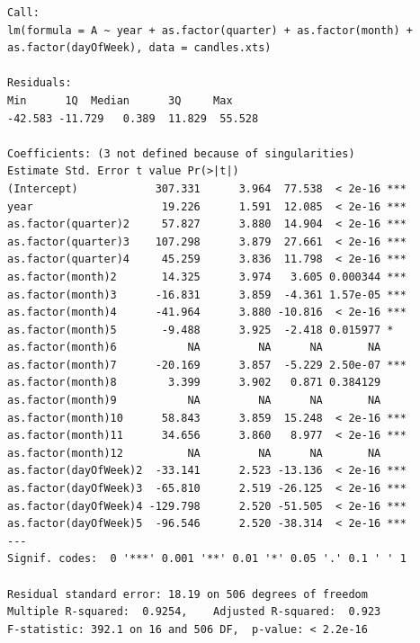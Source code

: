 \documentclass[a4paper,11pt]{article}
\begin{document}
%
\begin{lstlisting}
Call:
lm(formula = A ~ year + as.factor(quarter) + as.factor(month) + 
as.factor(dayOfWeek), data = candles.xts)

Residuals:
Min      1Q  Median      3Q     Max 
-42.583 -11.729   0.389  11.829  55.528 

Coefficients: (3 not defined because of singularities)
Estimate Std. Error t value Pr(>|t|)    
(Intercept)            307.331      3.964  77.538  < 2e-16 ***
year                    19.226      1.591  12.085  < 2e-16 ***
as.factor(quarter)2     57.827      3.880  14.904  < 2e-16 ***
as.factor(quarter)3    107.298      3.879  27.661  < 2e-16 ***
as.factor(quarter)4     45.259      3.836  11.798  < 2e-16 ***
as.factor(month)2       14.325      3.974   3.605 0.000344 ***
as.factor(month)3      -16.831      3.859  -4.361 1.57e-05 ***
as.factor(month)4      -41.964      3.880 -10.816  < 2e-16 ***
as.factor(month)5       -9.488      3.925  -2.418 0.015977 *  
as.factor(month)6           NA         NA      NA       NA    
as.factor(month)7      -20.169      3.857  -5.229 2.50e-07 ***
as.factor(month)8        3.399      3.902   0.871 0.384129    
as.factor(month)9           NA         NA      NA       NA    
as.factor(month)10      58.843      3.859  15.248  < 2e-16 ***
as.factor(month)11      34.656      3.860   8.977  < 2e-16 ***
as.factor(month)12          NA         NA      NA       NA    
as.factor(dayOfWeek)2  -33.141      2.523 -13.136  < 2e-16 ***
as.factor(dayOfWeek)3  -65.810      2.519 -26.125  < 2e-16 ***
as.factor(dayOfWeek)4 -129.798      2.520 -51.505  < 2e-16 ***
as.factor(dayOfWeek)5  -96.546      2.520 -38.314  < 2e-16 ***
---
Signif. codes:  0 '***' 0.001 '**' 0.01 '*' 0.05 '.' 0.1 ' ' 1

Residual standard error: 18.19 on 506 degrees of freedom
Multiple R-squared:  0.9254,	Adjusted R-squared:  0.923 
F-statistic: 392.1 on 16 and 506 DF,  p-value: < 2.2e-16
\end{lstlisting}
\end{document}
